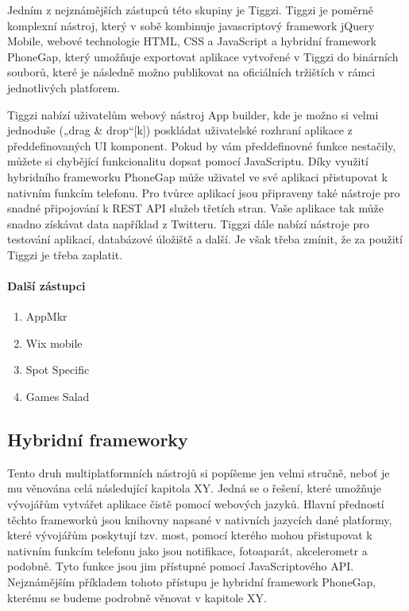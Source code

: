 Jedním z nejznámějších zástupců této skupiny je Tiggzi. Tiggzi je poměrně komplexní nástroj, který v sobě kombinuje javascriptový framework jQuery Mobile, webové technologie HTML, CSS a JavaScript a hybridní framework PhoneGap, který umožňuje exportovat aplikace vytvořené v Tiggzi do binárních souborů, které je následně možno publikovat na oficiálních tržištích v rámci jednotlivých platforem.

Tiggzi nabízí uživatelům webový nástroj App builder, kde je možno si velmi jednoduše („drag \& drop“[k]) poskládat uživatelské rozhraní aplikace z předdefinovaných UI komponent. Pokud by vám předdefinovné funkce nestačily, můžete si chybějící funkcionalitu dopsat pomocí JavaScriptu. Díky využití hybridního frameworku PhoneGap může uživatel ve své aplikaci přistupovat k nativním funkcím telefonu. Pro tvůrce aplikací jsou připraveny také nástroje pro snadné připojování k REST API služeb třetích stran. Vaše aplikace tak může snadno získávat data například z Twitteru. Tiggzi dále nabízí nástroje pro testování aplikací, databázové úložiště a další. Je však třeba zmínit, že za použití Tiggzi je třeba zaplatit.

\paragraph{Další zástupci}
\begin{enumerate}
	\item AppMkr
	\item Wix mobile
	\item Spot Specific
	\item Games Salad
\end{enumerate}

\subsection{Hybridní frameworky}
Tento druh multiplatformních nástrojů si popíšeme jen velmi stručně, neboť je mu věnována celá následující kapitola XY. Jedná se o řešení, které umožňuje vývojářům vytvářet aplikace čistě pomocí webových jazyků. Hlavní předností těchto frameworků jsou knihovny napsané v nativních jazycích dané platformy, které vývojářům poskytují tzv. most, pomocí kterého mohou přistupovat k nativním funkcím telefonu jako jsou notifikace, fotoaparát, akcelerometr a podobně. Tyto funkce jsou jim přístupné pomocí JavaScriptového API.
Nejznámějším příkladem tohoto přístupu je hybridní framework PhoneGap, kterému se budeme podrobně věnovat v kapitole XY.

